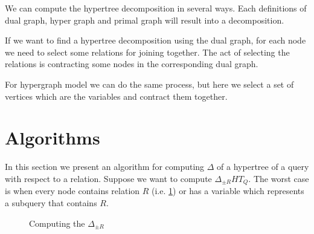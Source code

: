 \documentclass[12pt]{article}
\begin{document}
We can compute the hypertree decomposition in several ways. Each definitions of dual graph, hyper graph and primal graph will result into a decomposition.
\par
If we want to find a hypertree decomposition using the dual graph, for each node we need to select some relations for joining together. The act of selecting the relations is contracting some nodes in the corresponding dual graph. \\ \par
For hypergraph model we can do the same process, but here we select a set of vertices which are the variables and contract them together.
\section{Algorithms}
In this section we present an algorithm for computing  $\Delta$ of a hypertree of a query with respect to a relation.
Suppose we want to compute $\Delta_{\pm R}{HT_{Q}}$. 
The worst case is when every node contains relation $R$ (i.e. \ref{fig3}) or has a variable which represents a subquery that contains $R$.
\begin{figure}[htbp]
\begin{center}
\usetikzlibrary{fit}
\end{center}
\caption{Computing the $\Delta_{\pm R}$}
\label{fig3}
\end{figure}
\end{document}
